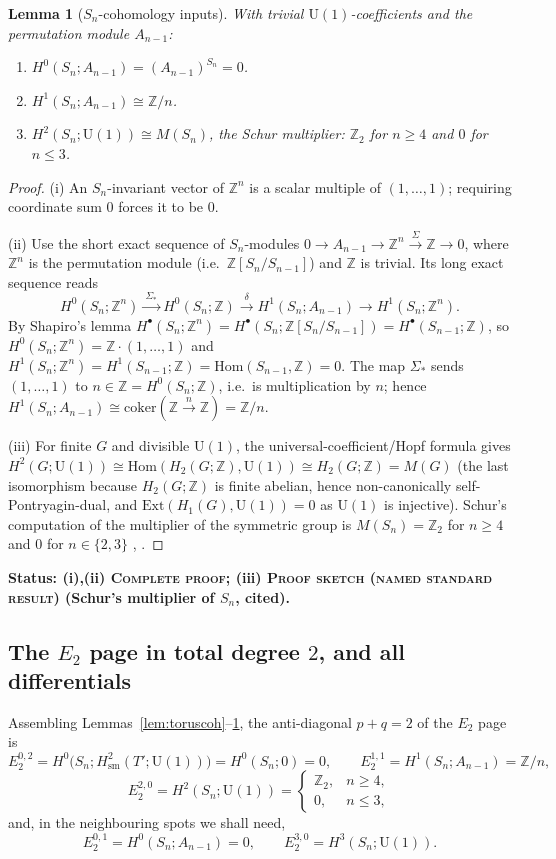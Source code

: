 \documentclass[11pt]{article}
\newtheorem{lemma}[theorem]{Lemma}
\theoremstyle{definition}
\newcommand{\U}{\mathrm{U}}
\newcommand{\Z}{\mathbb{Z}}
\newcommand{\Hom}{\mathrm{Hom}}
\newcommand{\Ext}{\mathrm{Ext}}
\newcommand{\Tp}{T'}
\newcommand{\sm}{\mathrm{sm}}
\newcommand{\STAT}[1]{\noindent\textbf{Status: #1}}
\newcommand{\COMPLETE}{\textsc{Complete proof}}
\newcommand{\SKETCH}{\textsc{Proof sketch (named standard result)}}
\begin{document}
\begin{lemma}[$S_n$-cohomology inputs]\label{lem:Sncoh}
With trivial $\U(1)$-coefficients and the permutation module $A_{n-1}$:
\begin{enumerate}
\item[(i)] $H^{0}(S_n;A_{n-1})=(A_{n-1})^{S_n}=0$.
\item[(ii)] $H^{1}(S_n;A_{n-1})\cong\Z/n$.
\item[(iii)] $H^{2}(S_n;\U(1))\cong M(S_n)$, the Schur multiplier: $\Z_2$ for $n\ge4$ and
$0$ for $n\le3$.
\end{enumerate}
\end{lemma}
\begin{proof}
(i) An $S_n$-invariant vector of $\Z^n$ is a scalar multiple of $(1,\dots,1)$; requiring
coordinate sum $0$ forces it to be $0$.

(ii) Use the short exact sequence of $S_n$-modules
$0\to A_{n-1}\to\Z^n\xrightarrow{\ \Sigma\ }\Z\to0$, where $\Z^n$ is the permutation module
(i.e.\ $\Z[S_n/S_{n-1}]$) and $\Z$ is trivial. Its long exact sequence reads
\[
H^0(S_n;\Z^n)\xrightarrow{\ \Sigma_*\ }H^0(S_n;\Z)\xrightarrow{\ \delta\ }
H^1(S_n;A_{n-1})\longrightarrow H^1(S_n;\Z^n).
\]
By Shapiro's lemma $H^{\bullet}(S_n;\Z^n)=H^{\bullet}(S_n;\Z[S_n/S_{n-1}])=
H^{\bullet}(S_{n-1};\Z)$, so $H^0(S_n;\Z^n)=\Z\cdot(1,\dots,1)$ and
$H^1(S_n;\Z^n)=H^1(S_{n-1};\Z)=\Hom(S_{n-1},\Z)=0$. The map $\Sigma_*$ sends $(1,\dots,1)$
to $n\in\Z=H^0(S_n;\Z)$, i.e.\ is multiplication by $n$; hence
$H^1(S_n;A_{n-1})\cong\mathrm{coker}(\Z\xrightarrow{n}\Z)=\Z/n$.

(iii) For finite $G$ and divisible $\U(1)$, the universal-coefficient/Hopf formula gives
$H^2(G;\U(1))\cong\Hom(H_2(G;\Z),\U(1))\cong H_2(G;\Z)=M(G)$ (the last isomorphism because
$H_2(G;\Z)$ is finite abelian, hence non-canonically self-Pontryagin-dual, and
$\Ext(H_1(G),\U(1))=0$ as $\U(1)$ is injective). Schur's computation of the multiplier of
the symmetric group is $M(S_n)=\Z_2$ for $n\ge4$ and $0$ for $n\in\{2,3\}$
\cite[Ch.~2]{Karpilovsky}, \cite{Schur}.
\end{proof}
\STAT{(i),(ii) \COMPLETE{}; (iii) \SKETCH{} (Schur's multiplier of $S_n$, cited).}

\subsection{The $E_2$ page in total degree $2$, and all differentials}

Assembling Lemmas~\ref{lem:toruscoh}--\ref{lem:Sncoh}, the anti-diagonal $p+q=2$ of the
$E_2$ page is
\[
E_2^{0,2}=H^0\big(S_n;H^2_{\sm}(\Tp;\U(1))\big)=H^0(S_n;0)=0,\qquad
E_2^{1,1}=H^1(S_n;A_{n-1})=\Z/n,
\]
\[
E_2^{2,0}=H^2(S_n;\U(1))=\begin{cases}\Z_2,& n\ge4,\\[1mm]0,& n\le3,\end{cases}
\]
and, in the neighbouring spots we shall need,
\[
E_2^{0,1}=H^0(S_n;A_{n-1})=0,\qquad E_2^{3,0}=H^3(S_n;\U(1)).
\]
\end{document}
